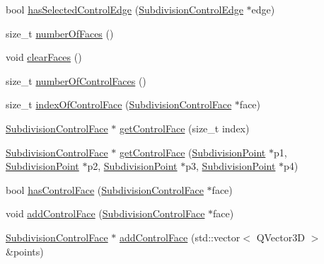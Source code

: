 \begin{DoxyCompactItemize}
\item 
bool \hyperlink{classShipCAD_1_1SubdivisionSurface_a3f7856ea95b0c881a1171845c1dc817e}{has\-Selected\-Control\-Edge} (\hyperlink{classShipCAD_1_1SubdivisionControlEdge}{Subdivision\-Control\-Edge} $\ast$edge)
\item 
size\-\_\-t \hyperlink{classShipCAD_1_1SubdivisionSurface_a9f67bb8bbd3a8f61a2b4abacc0cf10e4}{number\-Of\-Faces} ()
\item 
void \hyperlink{classShipCAD_1_1SubdivisionSurface_abf11847b9df1bc590c6c51d292430dd5}{clear\-Faces} ()
\item 
size\-\_\-t \hyperlink{classShipCAD_1_1SubdivisionSurface_a2fb486ba7285a42ae7fdab6e6c289fc5}{number\-Of\-Control\-Faces} ()
\item 
size\-\_\-t \hyperlink{classShipCAD_1_1SubdivisionSurface_aee61b8795a0f16c47df83f0ef0abd2e7}{index\-Of\-Control\-Face} (\hyperlink{classShipCAD_1_1SubdivisionControlFace}{Subdivision\-Control\-Face} $\ast$face)
\item 
\hyperlink{classShipCAD_1_1SubdivisionControlFace}{Subdivision\-Control\-Face} $\ast$ \hyperlink{classShipCAD_1_1SubdivisionSurface_a392f052a12118427919b910e99663d92}{get\-Control\-Face} (size\-\_\-t index)
\item 
\hyperlink{classShipCAD_1_1SubdivisionControlFace}{Subdivision\-Control\-Face} $\ast$ \hyperlink{classShipCAD_1_1SubdivisionSurface_a536574cc453e4790a769a3e7d47b7ff1}{get\-Control\-Face} (\hyperlink{classShipCAD_1_1SubdivisionPoint}{Subdivision\-Point} $\ast$p1, \hyperlink{classShipCAD_1_1SubdivisionPoint}{Subdivision\-Point} $\ast$p2, \hyperlink{classShipCAD_1_1SubdivisionPoint}{Subdivision\-Point} $\ast$p3, \hyperlink{classShipCAD_1_1SubdivisionPoint}{Subdivision\-Point} $\ast$p4)
\item 
bool \hyperlink{classShipCAD_1_1SubdivisionSurface_ad6e00013faf6c373bfc1421adb941ba4}{has\-Control\-Face} (\hyperlink{classShipCAD_1_1SubdivisionControlFace}{Subdivision\-Control\-Face} $\ast$face)
\item 
void \hyperlink{classShipCAD_1_1SubdivisionSurface_abbbb7422a86771451034d2fb7a76bb26}{add\-Control\-Face} (\hyperlink{classShipCAD_1_1SubdivisionControlFace}{Subdivision\-Control\-Face} $\ast$face)
\item 
\hyperlink{classShipCAD_1_1SubdivisionControlFace}{Subdivision\-Control\-Face} $\ast$ \hyperlink{classShipCAD_1_1SubdivisionSurface_a7c83a514f43b868b5fa286f3bc05a41e}{add\-Control\-Face} (std\-::vector$<$ Q\-Vector3\-D $>$ \&points)
\item 

\end{DoxyCompactItemize}
